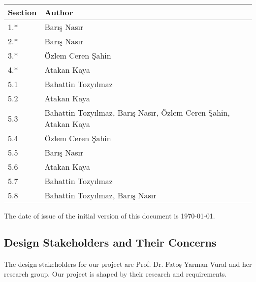     \begin{table}[h]
    \begin{tabular}{|l|l|}
    \hline
    \textbf{Section} & \textbf{Author} \\
    \hline
    1.* & Barış Nasır                                                     \\ \hline
    2.* & Barış Nasır                                                     \\ \hline
    3.* & Özlem Ceren Şahin                                               \\ \hline
    4.* & Atakan Kaya                                                     \\ \hline
    5.1 & Bahattin Tozyılmaz                                              \\ \hline
    5.2 & Atakan Kaya                                                     \\ \hline
    5.3 & Bahattin Tozyılmaz, Barış Nasır, Özlem Ceren Şahin, Atakan Kaya \\ \hline
    5.4 & Özlem Ceren Şahin                                               \\ \hline
    5.5 & Barış Nasır                                                     \\ \hline
    5.6 & Atakan Kaya                                                     \\ \hline
    5.7 & Bahattin Tozyılmaz                                              \\ \hline
    5.8 & Bahattin Tozyılmaz, Barış Nasır                                 \\ \hline
    \end{tabular}
\end{table}
    
    The date of issue of the initial version of this document is \today . 
\skipsubsection
    

\subsection{Design Stakeholders and Their Concerns}
\paragraph{}
\normalsize
The design stakeholders for our project are Prof. Dr. Fatoş Yarman Vural and her research group. Our project is shaped by their research and requirements.

